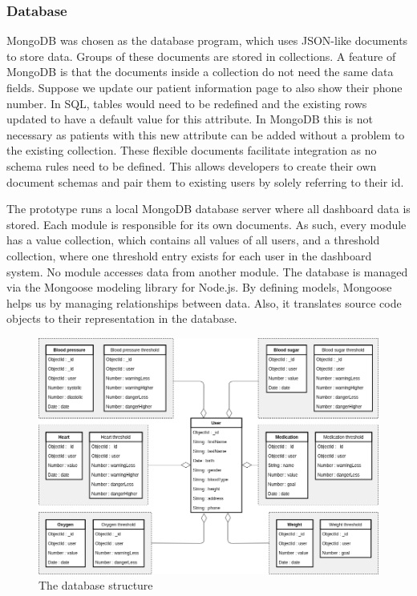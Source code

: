         \subsubsection{Database}

        MongoDB was chosen as the database program, which uses JSON-like documents to store data. Groups of these documents are stored in collections. A feature of MongoDB is that the documents inside a collection do not need the same data fields. Suppose we update our patient information page to also show their phone number. In SQL, tables would need to be redefined and the existing rows updated to have a default value for this attribute. In MongoDB this is not necessary as  patients with this new attribute can be added without a problem to the existing collection. These flexible documents facilitate integration as no schema rules need to be defined. This allows developers to create their own document schemas and pair them to existing users by solely referring to their id.

        The prototype runs a local MongoDB database server where all dashboard data is stored. Each module is responsible for its own documents. As such, every module has a value collection, which contains all values of all users, and a threshold collection, where one threshold entry exists for each user in the dashboard system. No module accesses data from another module. The database is managed via the Mongoose modeling library for Node.js. By defining models, Mongoose helps us by managing relationships between data. Also, it translates source code objects to their representation in the database.

        \begin{figure}[!t]
            \centering
            \includegraphics[width=1.0\textwidth]{chapters/4_implementation/db}
            \caption{The database structure}\label{fig:db}
        \end{figure}


